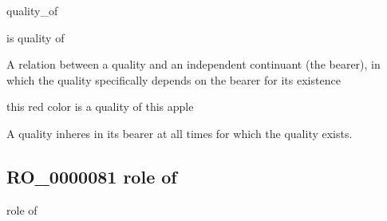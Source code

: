 \documentclass[letterpaper,10pt,english]{sphinxmanual}
\begin{document}
\begin{sphinxShadowBox}

\sphinxAtStartPar
quality\_of

\sphinxAtStartPar
is quality of
\end{sphinxShadowBox}

\begin{sphinxShadowBox}

\sphinxAtStartPar
{\hyperref[\detokenize{doc-RO_0000052::doc}]{}}
\end{sphinxShadowBox}

\begin{sphinxShadowBox}

\sphinxAtStartPar
A relation between a quality and an independent continuant (the bearer), in which the quality specifically depends on the bearer for its existence
\end{sphinxShadowBox}

\begin{sphinxShadowBox}

\sphinxAtStartPar
this red color is a quality of this apple
\end{sphinxShadowBox}

\begin{sphinxShadowBox}

\sphinxAtStartPar
A quality inheres in its bearer at all times for which the quality exists.
\end{sphinxShadowBox}

\begin{sphinxShadowBox}

\sphinxAtStartPar
{}
\end{sphinxShadowBox}
\begin{quote}

\ignorespaces \end{quote}


\subsection{RO\_0000081 \sphinxhyphen{} role of}
\label{\detokenize{doc-RO_0000081:ro-0000081-role-of}}\label{\detokenize{doc-RO_0000081:index-0}}\label{\detokenize{doc-RO_0000081::doc}}
\begin{sphinxShadowBox}

\sphinxAtStartPar
role of
\end{sphinxShadowBox}
\end{document}
